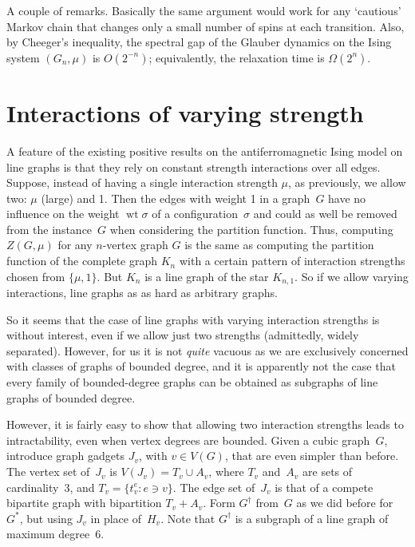 \documentclass[11pt]{amsart}
\newcommand{\wt}{\mathop{\mathrm{wt}}}
\begin{document}
A couple of remarks.  Basically the same argument would work for any `cautious' Markov chain that changes only a small number of spins at each transition. Also, by Cheeger's inequality, the spectral gap of the Glauber dynamics on the Ising system $(G_n,\mu)$ is $O(2^{-n})$; equivalently, the relaxation time is $\Omega(2^n)$.

\section{Interactions of varying strength}
A feature of the existing positive results on the antiferromagnetic Ising model on line graphs \cite{DyerHeinrichJerrumMuller,ChenLiuVigodaHolant,BencsCsikvariRegts} is that they rely on constant strength interactions over all edges.  Suppose, instead of having a single interaction strength $\mu$, as previously, we allow two: $\mu$ (large) and 1.  Then the edges with weight 1 in a graph~$G$ have no influence on the weight $\wt\sigma$ of a configuration~$\sigma$ and could as well be removed from the instance~$G$ when considering the partition function.  Thus, computing $Z(G,\mu)$ for any $n$-vertex graph $G$ is the same as computing the partition function of the complete graph $K_n$ with a certain pattern of interaction strengths chosen from $\{\mu,1\}$. But $K_n$ is a line graph of the star $K_{n,1}$. So if we allow varying interactions, line graphs as as hard as arbitrary graphs. 

So it seems that the case of line graphs with varying interaction strengths is without interest, even if we allow just two strengths (admittedly, widely separated).  However, for us it is not \emph{quite} vacuous as we are exclusively concerned with classes of graphs of bounded degree, and it is apparently not the case that every family of bounded-degree graphs can be obtained as subgraphs of line graphs of bounded degree.

However, it is fairly easy to show that allowing two interaction strengths leads to intractability, even when vertex degrees are bounded.  Given a cubic graph~$G$, introduce graph gadgets $J_v$, with $v\in V(G)$, that are even simpler than before.  The vertex set of~$J_v$ is $V(J_v)=T_v\cup A_v$, where $T_v$ and~$A_v$ are sets of cardinality~3, and $T_v=\{t_v^e:e\ni v\}$.  The edge set of~$J_v$ is that of a compete bipartite graph with bipartition $T_v+A_v$. Form $G^\dag$ from~$G$ as we did before for~$G^*$, but using $J_v$ in place of~$H_v$.   Note that $G^\dag$ is a subgraph of a line graph of maximum degree~6.  
\end{document}

